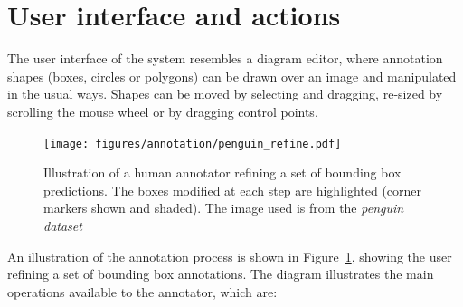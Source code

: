 \section {User interface and actions}
\label{sec:user_interface}
 
The user interface of the system resembles a diagram editor, where annotation shapes (boxes, circles or polygons) can be drawn over an image and manipulated in the usual ways. Shapes can be moved by selecting and dragging, re-sized by scrolling the mouse wheel or by dragging control points. 

\begin{figure}[htb!]
  \centering
  \texttt{[image: figures/annotation/penguin\_refine.pdf]}
  \caption{Illustration of a human annotator refining a set of bounding box predictions. The boxes modified at each step are highlighted (corner markers shown and shaded). The image used is from the \emph{penguin dataset} \cite{PenguinData} }   
  \label{fig:penguin_refinement}
\end{figure}

An illustration of the annotation process is shown in Figure~\ref{fig:penguin_refinement}, showing the user refining a set of bounding box annotations. The diagram illustrates the main operations available to the annotator, which are:

